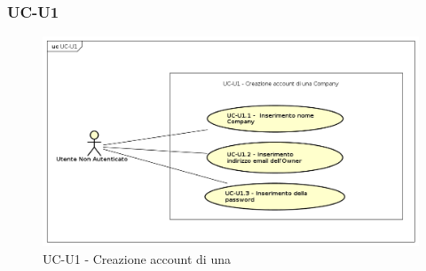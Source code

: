 \subsubsection{UC-U1}

    \begin{figure}[H]
      \begin{center}
        \includegraphics[width=12cm]{res/img/UCUtenti/UCUtenteNA/UC-U1-Creazione Account Azienda/UC-U1.png}
      \caption{UC-U1 - Creazione account di una }
      \end{center} 
    \end{figure}    
    
